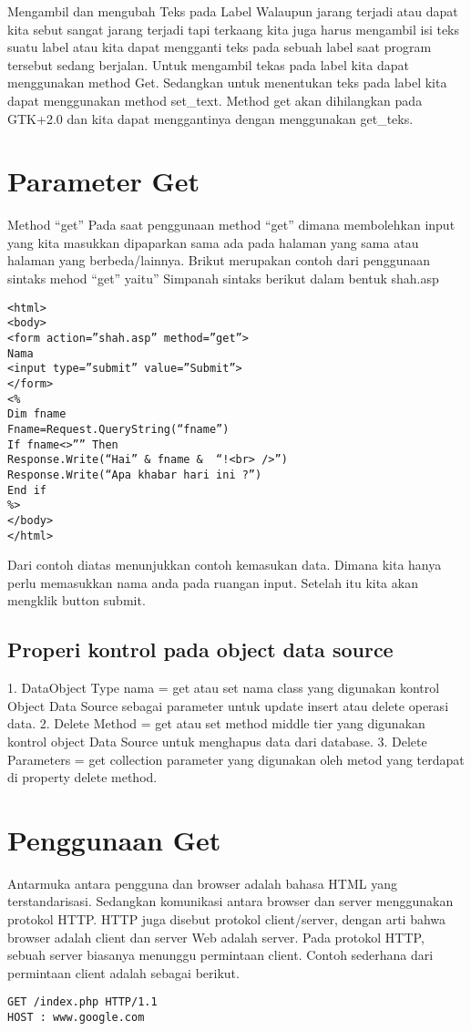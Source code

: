 Mengambil dan mengubah Teks pada Label
Walaupun jarang terjadi atau dapat kita sebut sangat jarang terjadi tapi terkaang kita juga harus mengambil isi teks suatu label atau 
kita dapat mengganti teks pada sebuah label saat program tersebut sedang berjalan.
Untuk mengambil tekas pada label kita dapat menggunakan method Get. Sedangkan untuk menentukan teks pada label kita dapat menggunakan 
method set_text. 
Method get akan dihilangkan pada GTK+2.0 dan kita dapat menggantinya dengan menggunakan get_teks.

\section{Parameter Get}
Method “get”
Pada saat penggunaan method “get” dimana membolehkan input yang kita masukkan dipaparkan sama ada pada halaman yang sama atau halaman 
 yang berbeda/lainnya. Brikut merupakan contoh dari penggunaan sintaks mehod “get” yaitu”
Simpanah sintaks berikut dalam bentuk shah.asp
\begin{verbatim}
<html>
<body>
<form action=”shah.asp” method=”get”>
Nama
<input type=”submit” value=”Submit”>
</form>
<%
Dim fname
Fname=Request.QueryString(“fname”)
If fname<>”” Then
Response.Write(“Hai” & fname &  “!<br> />”)
Response.Write(“Apa khabar hari ini ?”)
End if
%>
</body>
</html>
\end{verbatim}

Dari contoh diatas menunjukkan contoh kemasukan data. Dimana kita hanya perlu memasukkan nama anda pada ruangan input. Setelah itu kita 
akan mengklik button submit.

\subsection{Properi kontrol pada object data source}
1.	DataObject Type nama = get atau set nama class yang digunakan kontrol Object Data Source sebagai parameter untuk update insert atau 
delete operasi data.
2.	Delete Method = get atau set method middle tier yang digunakan kontrol object Data Source untuk menghapus data dari database.
3.	Delete Parameters = get collection parameter yang digunakan oleh metod yang terdapat di property delete method.

\section{Penggunaan Get}
Antarmuka antara pengguna dan browser adalah bahasa HTML yang terstandarisasi. Sedangkan komunikasi antara browser dan server menggunakan protokol HTTP. HTTP juga disebut protokol client/server, dengan arti bahwa browser adalah client dan server Web adalah server. Pada protokol HTTP, sebuah server biasanya menunggu permintaan client. 
Contoh sederhana dari permintaan client adalah sebagai berikut.
\begin{verbatim}
GET /index.php HTTP/1.1
HOST : www.google.com
\end{verbatim}
